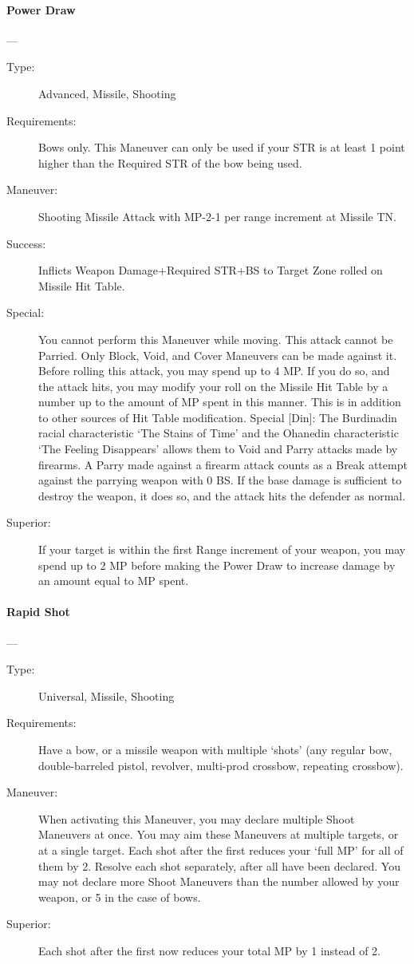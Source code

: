 \documentclass[oneside,11pt,english]{book}
\begin{document}
\paragraph{\large\label{man:Power Draw}Power Draw}---\quad{\large[???????]}
\vspace{-10pt}\begin{description} 
\item [Type:] Advanced, Missile, Shooting 
\item [Requirements:] Bows only. This Maneuver can only be used if your STR is at least 1 point higher than 
the Required STR of the bow being used. 
\item [Maneuver:] Shooting Missile Attack with MP-2-1 per range increment at Missile TN. 
\item [Success:] Inflicts Weapon Damage+Required STR+BS to Target Zone rolled on Missile Hit Table. 
\item [Special:] You cannot perform this Maneuver while moving. 
This attack cannot be Parried. Only Block, Void, and Cover Maneuvers can be made against it. 
Before rolling this attack, you may spend up to 4 MP. If you do so, and the attack hits, you may modify 
your roll on the Missile Hit Table by a number up to the amount of MP spent in this manner. This is in 
addition to other sources of Hit Table modification. 
Special [Din]: The Burdinadin racial characteristic ‘The Stains of Time’ and the Ohanedin characteristic 
‘The Feeling Disappears’ allows them to Void and Parry attacks made by firearms. A Parry made against 
a firearm attack counts as a Break attempt against the parrying weapon with 0 BS. If the base damage is 
sufficient to destroy the weapon, it does so, and the attack hits the defender as normal. 
\item [Superior:] If your target is within the first Range increment of your weapon, you may spend up to 2 MP 
before making the Power Draw to increase damage by an amount equal to MP spent. 
\end{description}
\paragraph{\large\label{man:Rapid Shot}Rapid Shot}---\quad{\large[???????]}
\vspace{-10pt}\begin{description} 
\item [Type:] Universal, Missile, Shooting 
\item [Requirements:] Have a bow, or a missile weapon with multiple ‘shots’ (any regular bow, double-barreled 
pistol, revolver, multi-prod crossbow, repeating crossbow). 
\item [Maneuver:] When activating this Maneuver, you may declare multiple Shoot Maneuvers at once. You 
may aim these Maneuvers at multiple targets, or at a single target. Each shot after the first reduces your 
‘full MP’ for all of them by 2. Resolve each shot separately, after all have been declared. You may not 
declare more Shoot Maneuvers than the number allowed by your weapon, or 5 in the case of bows. 
\item [Superior:] Each shot after the first now reduces your total MP by 1 instead of 2. 
\end{description}
\end{document}
